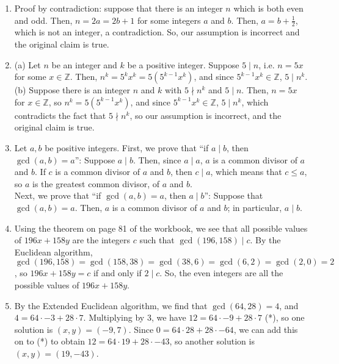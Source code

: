 \documentclass[a4paper,12pt]{article}
\begin{document}
\begin{enumerate}
\item Proof by contradiction: suppose that there is an integer $n$ which is
both even and odd. Then, $n = 2a = 2b + 1$ for some integers $a$ and $b$. Then,
$a = b + \frac{1}{2}$, which is not an integer, a contradiction. So, our
assumption is incorrect and the original claim is true.

\item (a) Let $n$ be an integer and $k$ be a positive integer.
Suppose $5 \mid n$, i.e. $n = 5x$ for some $x \in \mathbb{Z}$. Then,
$n^k = 5^k x^k = 5(5^{k-1}x^k)$, and since $5^{k-1}x^k \in \mathbb{Z}$, $5 \mid n^k$.
\\
(b) Suppose there is an integer $n$ and $k$ with $5 \nmid n^k$ and $5 \mid n$.
Then, $n = 5x$ for $x \in \mathbb{Z}$, so $n^k = 5(5^{k-1}x^k)$, and since
$5^{k-1}x^k \in \mathbb{Z}$, $5 \mid n^k$, which contradicts the fact that
$5 \nmid n^k$, so our assumption is incorrect, and the original claim is true.

\item Let $a, b$ be positive integers. First, we prove that ``if $a \mid b$,
then $\gcd(a, b) = a$'': Suppose $a \mid b$. Then, since $a \mid a$, $a$ is a
common divisor of $a$ and $b$. If $c$ is a common divisor of $a$ and $b$, then
$c \mid a$, which means that $c \leq a$, so $a$ is the greatest common divisor,
of $a$ and $b$.
\\
Next, we prove that ``if $\gcd(a, b) = a$, then $a \mid b$'': Suppose that
$\gcd(a, b) = a$. Then, $a$ is a common divisor of $a$ and $b$; in particular,
$a \mid b$.

\item Using the theorem on page 81 of the workbook, we see that all possible
values of $196x + 158y$ are the integers $c$ such that $\gcd(196, 158) \mid c$.
By the Euclidean algorithm,
$\gcd(196, 158) = \gcd(158, 38) = \gcd(38, 6) = \gcd(6, 2) = \gcd(2, 0) = 2$, so
$196x + 158y = c$ if and only if $2 \mid c$.
So, the even integers are all the possible values of $196x + 158y$.

\item By the Extended Euclidean algorithm, we find that $\gcd(64, 28) = 4$, and
$4 = 64 \cdot -3 + 28 \cdot 7$. Multiplying by $3$, we have
$12 = 64 \cdot -9 + 28 \cdot 7$ (*), so one solution is $(x, y) = (-9, 7)$.
Since $0 = 64 \cdot 28 + 28 \cdot -64$, we can add this on to (*) to obtain
$12 = 64 \cdot 19 + 28 \cdot -43$, so another solution is
$(x, y) = (19, -43)$.
\end{enumerate}
\end{document}
